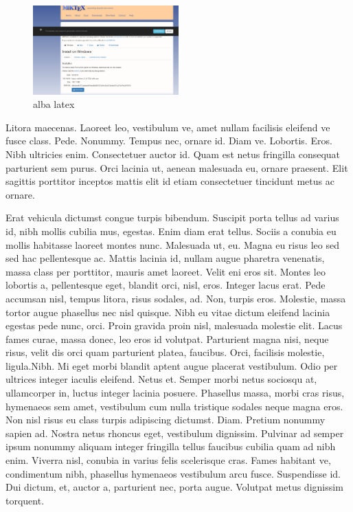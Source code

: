 \documentclass[a5paper,10pt,twocolumn,twoside]{book}
\begin{document}
\begin{figure}
  \begin{center}
    \includegraphics[width=0.5\textwidth]{img/miktex.png}
    \caption{alba latex}
    \label{fig:}
  \end{center}
\end{figure}

Litora maecenas. Laoreet leo, vestibulum ve, amet nullam facilisis eleifend ve fusce class. Pede. Nonummy. Tempus nec, ornare id. Diam ve. Lobortis. Eros. Nibh ultricies enim. Consectetuer auctor id. Quam est netus fringilla consequat parturient sem purus. Orci lacinia ut, aenean malesuada eu, ornare praesent. Elit sagittis porttitor inceptos mattis elit id etiam consectetuer tincidunt metus ac ornare.

Erat vehicula dictumst congue turpis bibendum. Suscipit porta tellus ad varius id, nibh mollis cubilia mus, egestas. Enim diam erat tellus. Sociis a conubia eu mollis habitasse laoreet montes nunc. Malesuada ut, eu. Magna eu risus leo sed sed hac pellentesque ac. Mattis lacinia id, nullam augue pharetra venenatis, massa class per porttitor, mauris amet laoreet. Velit eni eros sit. Montes leo lobortis a, pellentesque eget, blandit orci, nisl, eros. Integer lacus erat. Pede accumsan nisl, tempus litora, risus sodales, ad. Non, turpis eros. Molestie, massa tortor augue phasellus nec nisl quisque. Nibh eu vitae dictum eleifend lacinia egestas pede nunc, orci. Proin gravida proin nisl, malesuada molestie elit. Lacus fames curae, massa donec, leo eros id volutpat. Parturient magna nisi, neque risus, velit dis orci quam parturient platea, faucibus. Orci, facilisis molestie, ligula.Nibh. Mi eget morbi blandit aptent augue placerat vestibulum. Odio per ultrices integer iaculis eleifend. Netus et. Semper morbi netus sociosqu at, ullamcorper in, luctus integer lacinia posuere. Phasellus massa, morbi cras risus, hymenaeos sem amet, vestibulum cum nulla tristique sodales neque magna eros. Non nisl risus eu class turpis adipiscing dictumst. Diam. Pretium nonummy sapien ad. Nostra netus rhoncus eget, vestibulum dignissim. Pulvinar ad semper ipsum nonummy aliquam integer fringilla tellus faucibus cubilia quam ad nibh enim. Viverra nisl, conubia in varius felis scelerisque cras. Fames habitant ve, condimentum nibh, phasellus hymenaeos vestibulum arcu fusce. Suspendisse id. Dui dictum, et, auctor a, parturient nec, porta augue. Volutpat metus dignissim torquent.
\end{document}
